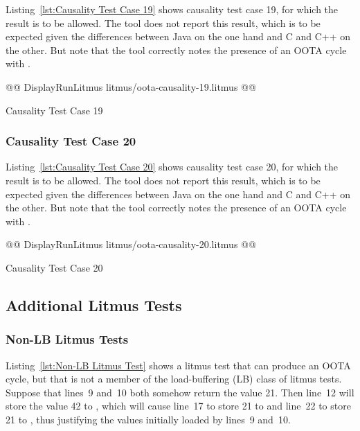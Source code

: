 \documentclass[10]{article}
\begin{document}
Listing~\ref{lst:Causality Test Case 19}
shows causality test case 19, for which the 
result is to be allowed.
The  tool does not report this result, which is to be expected
given the differences between Java on the one hand and C and C++
on the other.
But note that the  tool correctly notes the presence of an
OOTA cycle with .

\begin{listing}[tbp]
@@ DisplayRunLitmus litmus/oota-causality-19.litmus @@
\caption{Causality Test Case 19}
\label{lst:Causality Test Case 19}
\end{listing}

\subsubsection{Causality Test Case 20}
\label{app:Causality Test Case 20}

Listing~\ref{lst:Causality Test Case 20}
shows causality test case 20, for which the 
result is to be allowed.
The  tool does not report this result, which is to be expected
given the differences between Java on the one hand and C and C++
on the other.
But note that the  tool correctly notes the presence of an
OOTA cycle with .

\begin{listing}[tbp]
@@ DisplayRunLitmus litmus/oota-causality-20.litmus @@
\caption{Causality Test Case 20}
\label{lst:Causality Test Case 20}
\end{listing}

\subsection{Additional Litmus Tests}
\label{app:Additional Litmus Tests}

\subsubsection{Non-LB Litmus Tests}
\label{app:Non-LB Litmus Tests}

Listing~\ref{lst:Non-LB Litmus Test}
shows a litmus test that can produce an OOTA cycle, but that is not
a member of the load-buffering (LB) class of litmus tests.
Suppose that lines~9 and~10 both somehow return the value 21.
Then line~12 will store the value 42 to , which will cause
line~17 to store 21 to  and line~22 to store 21 to ,
thus justifying the values initially loaded by lines~9 and~10.
\end{document}
